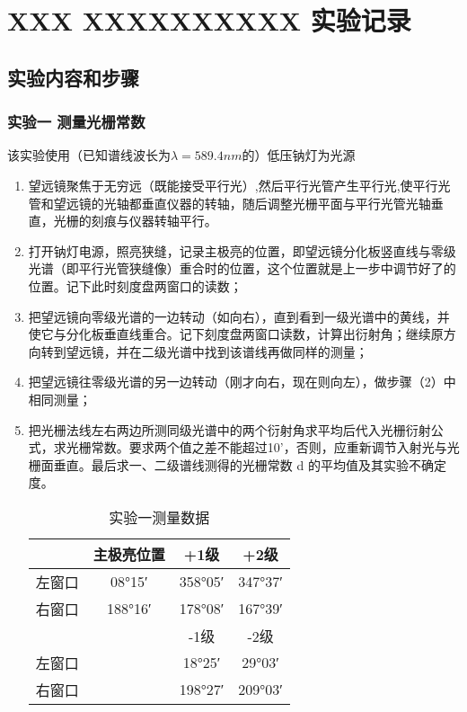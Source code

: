 \documentclass[dvipsnames, svgnames,a4paper,11pt]{article}
\begin{document}
\section{XXX \quad XXXXXXXXXX \quad\heiti 实验记录}
\subsection{实验内容和步骤}

	\subsubsection{实验一 测量光栅常数}
	
	该实验使用（已知谱线波长为$\lambda=589.4nm$的）低压钠灯为光源
	\begin{enumerate}
		\item 望远镜聚焦于无穷远（既能接受平行光）,然后平行光管产生平行光,使平行光管和望远镜的光轴都垂直仪器的转轴，随后调整光栅平面与平行光管光轴垂直，光栅的刻痕与仪器转轴平行。
		
		\item 打开钠灯电源，照亮狭缝，记录主极亮的位置，即望远镜分化板竖直线与零级光谱（即平行光管狭缝像）重合时的位置，这个位置就是上一步中调节好了的位置。记下此时刻度盘两窗口的读数；
		
		\item 把望远镜向零级光谱的一边转动（如向右），直到看到一级光谱中的黄线，并使它与分化板垂直线重合。记下刻度盘两窗口读数，计算出衍射角；继续原方向转到望远镜，并在二级光谱中找到该谱线再做同样的测量；
		
		\item 把望远镜往零级光谱的另一边转动（刚才向右，现在则向左），做步骤（2）中相同测量；
		
		\item 把光栅法线左右两边所测同级光谱中的两个衍射角求平均后代入光栅衍射公式，求光栅常数。要求两个值之差不能超过10’，否则，应重新调节入射光与光栅面垂直。最后求一、二级谱线测得的光栅常数 d 的平均值及其实验不确定度。
		
	\begin{table}[htbp]
		\centering
		\begin{tabular}{|c|c|c|c|}
			\hline
			    & 主极亮位置 & +1级 & +2级 \\
			\hline
			左窗口 & 08°15′ & 358°05′ & 347°37′ \\
			\hline
			右窗口 & 188°16′ & 178°08′ & 167°39′ \\
			\hline
			    &        & -1级 & -2级 \\
			\hline
			左窗口 &      & 18°25′ & 29°03′ \\
			\hline
			右窗口 &      & 198°27′ & 209°03′ \\
			\hline
			
		\end{tabular}
		\caption{实验一测量数据}
		\label{tab:mytable}
	\end{table}
	
	\end{enumerate}
\end{document}
